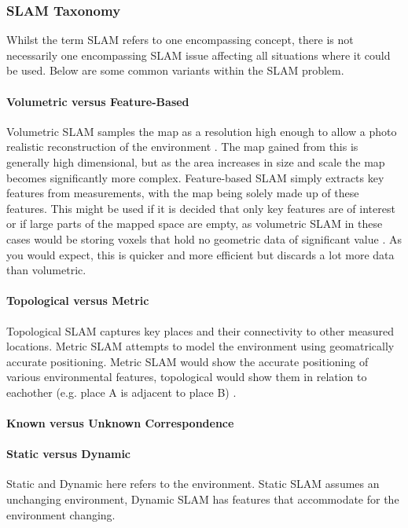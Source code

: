 				\medskip
				
				\subsubsection{SLAM Taxonomy}
				Whilst the term SLAM refers to one encompassing concept, there is not necessarily one encompassing SLAM issue affecting all situations where it could be used. Below are some common variants within the SLAM problem.
				
					\paragraph{Volumetric versus Feature-Based}
					Volumetric SLAM samples the map as a resolution high enough to allow a photo realistic reconstruction of the environment \citep{thrun2008simultaneous}. The map gained from this is generally high dimensional, but as the area increases in size and scale the map becomes significantly more complex. Feature-based SLAM simply extracts key features from measurements, with the map being solely made up of these features. This might be used if it is decided that only key features are of interest or if large parts of the mapped space are empty, as volumetric SLAM in these cases would be storing voxels that hold no geometric data of significant value \citep{vespa2018efficient}. As you would expect, this is quicker and more efficient but discards a lot more data than volumetric. 
					
					\paragraph{Topological versus Metric}
					Topological SLAM captures key places and their connectivity to other measured locations. Metric SLAM attempts to model the environment using geomatrically accurate positioning. Metric SLAM would show the accurate positioning of various environmental features, topological would show them in relation to eachother (e.g. place A is adjacent to place B) \citep{thrun2008simultaneous}.
					
					\paragraph{Known versus Unknown Correspondence}
					
					
					\paragraph{Static versus Dynamic}
					Static and Dynamic here refers to the environment. Static SLAM assumes an unchanging environment, Dynamic SLAM has features that accommodate for the environment changing.
					
